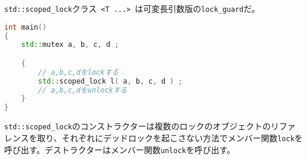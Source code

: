 %

\lstinline!std::scoped_lock!クラス~\lstinline!<T ...>!~は可変長引数版の\lstinline!lock_guard!だ。

\begin{lstlisting}[language=C++]
int main()
{
    std::mutex a, b, c, d ;

    {
        // a,b,c,dをlockする
        std::scoped_lock l( a, b, c, d ) ;
        // a,b,c,dをunlockする
    }
}
\end{lstlisting}

\lstinline!std::scoped_lock!のコンストラクターは複数のロックのオブジェクトのリファレンスを取り、それぞれにデッドロックを起こさない方法でメンバー関数\lstinline!lock!を呼び出す。デストラクターはメンバー関数\lstinline!unlock!を呼び出す。
